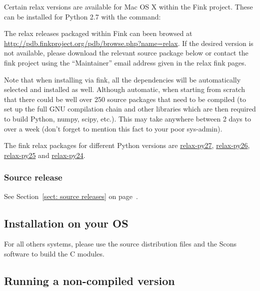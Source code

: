 Certain relax versions are available for Mac OS X within the Fink project.  These can be installed for Python 2.7 with the command:


The relax releases packaged within Fink can been browsed at \href{http://pdb.finkproject.org/pdb/browse.php?name=relax}{http://pdb.finkproject.org/pdb/browse.php?name=relax}. If the desired version is not available, please download the relevant source package below or contact the fink project using the ``Maintainer'' email address given in the relax fink pages.

Note that when installing via fink, all the dependencies will be automatically selected and installed as well.  Although automatic, when starting from scratch that there could be well over 250 source packages that need to be compiled (to set up the full GNU compilation chain and other libraries which are then required to build Python, numpy, scipy, etc.).  This may take anywhere between 2 days to over a week (don't forget to mention this fact to your poor sys-admin).

The fink relax packages for different Python versions are \href{http://pdb.finkproject.org/pdb/package.php/relax-py27}{relax-py27}, \href{http://pdb.finkproject.org/pdb/package.php/relax-py26}{relax-py26}, \href{http://pdb.finkproject.org/pdb/package.php/relax-py25}{relax-py25} and \href{http://pdb.finkproject.org/pdb/package.php/relax-py24}{relax-py24}.

\subsubsection{Source release}

See Section~\ref{sect: source releases} on page~\pageref{sect: source releases}.


\subsection{Installation on your OS}

For all others systems, please use the source distribution files and the Scons software to build the C modules.



\subsection{Running a non-compiled version}

